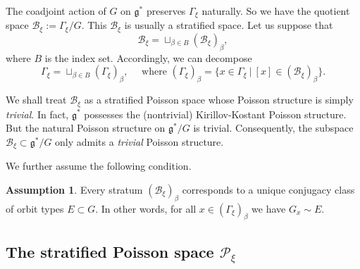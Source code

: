 \documentclass[12pt]{amsart}
\theoremstyle{definition}
\newtheorem{assumption}[theorem]{Assumption}
\numberwithin{equation}{section}
\newcommand{\gstar}{\mathfrak{g}^*}
\newcommand{\SET}[1]{\{#1\}}
\newcommand{\Pxi}{\mathcal{P}_{\xi}}
\newcommand{\Bxi}{\mathcal{B}_{\xi}}
\begin{document}
The coadjoint action of $G$ on $\gstar$ preserves $\Gamma_{\xi}$ naturally. So we have the quotient space $\Bxi:=\Gamma_{\xi}/G$. This $\Bxi$ is usually a stratified space. Let us suppose that 
$$
\Bxi=\sqcup_{\beta\in B} (\Bxi)_{\beta},
$$
where $B$ is the index set. Accordingly, we can decompose
\begin{equation}\label{Eqt:GammaxidecomposebyB} 
\Gamma_{\xi}=\sqcup_{\beta\in B} (\Gamma_{\xi})_{\beta},\quad \mbox{ where }(\Gamma_{\xi})_{\beta}=\SET{x\in \Gamma_{\xi}~|~[x]\in (\Bxi)_{\beta}}.
\end{equation}



We shall treat $\Bxi$ as a stratified Poisson space whose Poisson structure is simply \textit{trivial}. In fact, $\gstar$ possesses the (nontrivial) Kirillov-Kostant Poisson   structure. But the natural Poisson structure on $\gstar/G$ is trivial. Consequently, the subspace $\Bxi \subset \gstar/G$ only admits a \textit{trivial} Poisson structure.
 
 
 We further assume   the following condition. 

\begin{assumption}\label{Assumption:sameorbittype}
Every stratum $(\Bxi)_{\beta}$ corresponds to a unique conjugacy class of orbit types $E\subset G$. In other words,   for all   $x\in  (\Gamma_{\xi})_{\beta}$ we have $G_x\sim E$.
\end{assumption} 



	\subsection{The stratified  Poisson space $\Pxi$}\label{subsubSec:RPBxi}~
	
\end{document}
